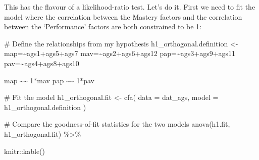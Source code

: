 \documentclass[
  letterpaper,
  DIV=11,
  numbers=noendperiod]{scrreprt}
\newenvironment{Shaded}{\begin{snugshade}}{\end{snugshade}}
\newcommand{\AttributeTok}[1]{\textcolor[rgb]{0.40,0.45,0.13}{#1}}
\newcommand{\CommentTok}[1]{\textcolor[rgb]{0.37,0.37,0.37}{#1}}
\newcommand{\FunctionTok}[1]{\textcolor[rgb]{0.28,0.35,0.67}{#1}}
\newcommand{\NormalTok}[1]{\textcolor[rgb]{0.00,0.23,0.31}{#1}}
\newcommand{\OtherTok}[1]{\textcolor[rgb]{0.00,0.23,0.31}{#1}}
\newcommand{\SpecialCharTok}[1]{\textcolor[rgb]{0.37,0.37,0.37}{#1}}
\newcommand{\StringTok}[1]{\textcolor[rgb]{0.13,0.47,0.30}{#1}}
\begin{document}
This has the flavour of a likelihood-ratio test. Let's do it. First we
need to fit the model where the correlation between the Mastery factors
and the correlation between the `Performance' factors are both
constrained to be 1:

\begin{Shaded}
\begin{Highlighting}[]
\CommentTok{\# Define the relationships from my hypothesis}
\NormalTok{h1\_orthogonal.definition }\OtherTok{\textless{}{-}} 
\StringTok{\textquotesingle{}map=\textasciitilde{}ags1+ags5+ags7}
\StringTok{mav=\textasciitilde{}ags2+ags6+ags12}
\StringTok{pap=\textasciitilde{}ags3+ags9+ags11}
\StringTok{pav=\textasciitilde{}ags4+ags8+ags10}

\StringTok{map \textasciitilde{}\textasciitilde{} 1*mav}
\StringTok{pap \textasciitilde{}\textasciitilde{} 1*pav}
\StringTok{\textquotesingle{}}

\CommentTok{\# Fit the model}
\NormalTok{h1\_orthogonal.fit }\OtherTok{\textless{}{-}} \FunctionTok{cfa}\NormalTok{(}
  \AttributeTok{data  =}\NormalTok{ dat\_ags,}
  \AttributeTok{model =}\NormalTok{ h1\_orthogonal.definition}
\NormalTok{)}

\CommentTok{\# Compare the goodness{-}of{-}fit statistics for the two models}
\FunctionTok{anova}\NormalTok{(h1.fit, h1\_orthogonal.fit) }\SpecialCharTok{\%\textgreater{}\%} 
  
\NormalTok{  knitr}\SpecialCharTok{::}\FunctionTok{kable}\NormalTok{()}
\end{Highlighting}
\end{Shaded}
\end{document}
